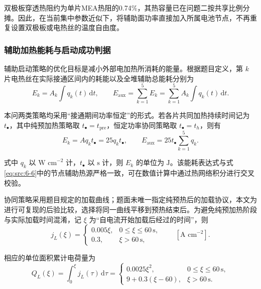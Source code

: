 \documentclass[bwprint]{gmcmthesis}
\numberwithin{equation}{section}
\numberwithin{figure}{section}
\begin{document}
 双极板穿透热阻约为单片MEA热阻的0.74\%，其热容量已在问题二按共享比例分摊。因此，在当前集中参数近似下，将辅助面功率直接加入所属电池节点，不再重复设置双极板或电热丝的温度自由度。

\subsubsection{辅助加热能耗与启动成功判据}

 辅助启动策略的优化目标是减小外部电加热所消耗的能量。根据题目定义，第 \(k\) 片电热丝在实际接通区间内的耗能以及全堆辅助总能耗分别为
\begin{equation}
E_k = A_k \int q_k(t) \, \text{d}t, \qquad E_{\text{aux}} = \sum_{k=1}^5 E_k = \sum_{k=1}^5 A_k \int q_k(t) \, \text{d}t. \label{eq:src:6-14}
\end{equation}

 本问两类策略均采用“接通期间功率恒定”的形式。若各片共同加热持续时间记为 \(t_\bullet\)，其中纯预加热策略取 \(t_\bullet = t_{\text{pre}}\)，恒定功率协同策略取 \(t_\bullet = t_h\)，则有
\begin{equation}
E_k = A q_k t_\bullet = 25 q_k t_\bullet, \qquad E_{\text{aux}} = 25 t_\bullet \sum_{k=1}^5 q_k. \label{eq:src:6-15}
\end{equation}

 式中 \(q_k\) 以 \(\text{W cm}^{-2}\) 计，\(t_\bullet\) 以 \(\text{s}\) 计，则 \(E_k\) 的单位为 \(\text{J}\)。该能耗表达式与式\eqref{eq:src:6-6}中的节点辅助热源严格一致，可在数值计算中通过热网络积分进行交叉校验。

 协同策略采用题目规定的加载曲线；题面未唯一指定纯预热后的加载协议，本文为进行可复现的后验比较，选择将同一曲线平移到预热结束后。为避免纯预加热阶段与实际加载时间混淆，记 \(\xi\) 为“自电流开始加载后经过的时间”，则
\begin{equation}
j_L(\xi) = \begin{cases}
0.005\xi, & 0 \leq \xi \leq 60 \, \text{s}, \\
0.3, & \xi > 60 \, \text{s},
\end{cases} \qquad [\text{A cm}^{-2}]. \label{eq:src:6-16}
\end{equation}

 相应的单位面积累计电荷量为
\begin{equation}
Q_L(\xi) = \int_0^\xi j_L(\tau) \, \text{d}\tau = \begin{cases}
0.0025\xi^2, & 0 \leq \xi \leq 60 \, \text{s}, \\
9 + 0.3(\xi - 60), & \xi > 60 \, \text{s}.
\end{cases} \label{eq:src:6-17}
\end{equation}
\end{document}
